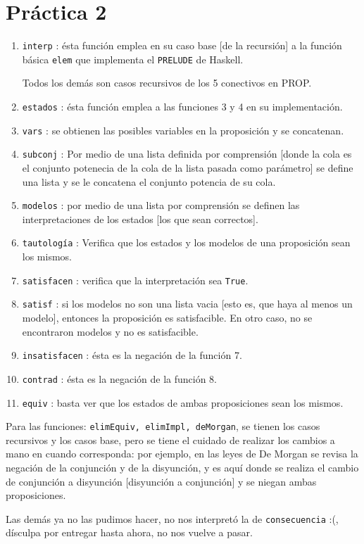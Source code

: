 \documentclass{article}
\newcommand{\code}[1]{\textcolor{white!25!black}{\texttt{#1}}}
\begin{document}
\section*{\LARGE{Práctica 2}}
\begin{enumerate}
\item \code{interp} : ésta función emplea en su caso base [de la recursión]
  a la función básica \code{elem} que implementa el \code{PRELUDE} de Haskell.
  
  Todos los demás son casos recursivos de los 5 conectivos en PROP.
\item \code{estados} : ésta función emplea a las funciones 3 y 4 en su implementación.
\item \code{vars} : se obtienen las posibles variables en la proposición y se concatenan.
\item \code{subconj} : Por medio de una lista definida por comprensión [donde la cola es
  el conjunto potenecia de la cola de la lista pasada como parámetro] se define una lista
  y se le concatena el conjunto potencia de su cola.
\item \code{modelos} : por medio de una lista por comprensión se definen las
  interpretaciones de los estados [los que sean correctos].
\item \code{tautología} : Verifica que los estados y los modelos de una proposición sean los mismos.
\item \code{satisfacen} : verifica que la interpretación sea \code{True}.
\item \code{satisf} : si los modelos no son una lista vacia [esto es, que haya al menos un modelo],
  entonces la proposición es satisfacible. En otro caso, no se encontraron modelos y no es satisfacible.
\item \code{insatisfacen} : ésta es la negación de la función 7.
\item \code{contrad} : ésta es la negación de la función 8.
\item \code{equiv} : basta ver que los estados de ambas proposiciones sean los mismos.
\end{enumerate}
Para las funciones: \code{elimEquiv, elimImpl, deMorgan}, se tienen los casos recursivos y los casos base,
pero se tiene el cuidado de realizar los cambios a mano en cuando corresponda: por ejemplo, en las leyes
de De Morgan se revisa la negación de la conjunción y de la disyunción, y es aquí donde se realiza el cambio
de conjunción a disyunción [disyunción a conjunción] y se niegan ambas proposiciones.

Las demás ya no las pudimos hacer, no nos interpretó la de \code{consecuencia} :(, dísculpa por entregar hasta
ahora, no nos vuelve a pasar.
\end{document}
